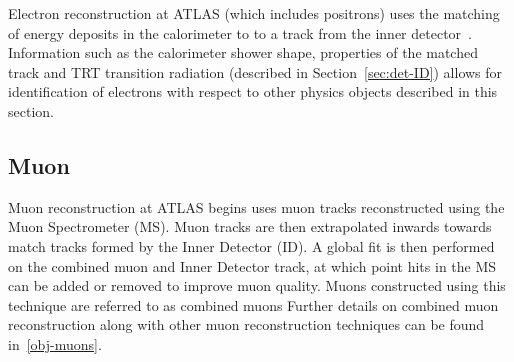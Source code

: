 Electron reconstruction at ATLAS (which includes positrons) uses
the matching of energy deposits in the calorimeter to
to a track from the inner detector~\cite{obj-electron}.
Information such as the calorimeter shower shape,
properties of the matched track
and TRT transition radiation (described in Section~\ref{sec:det-ID})
allows for identification of electrons with respect to other physics objects described in this section.

\subsection{Muon}
\label{sec:obj-muon}

Muon reconstruction at ATLAS begins uses muon tracks reconstructed using the Muon Spectrometer (MS).
Muon tracks are then extrapolated inwards towards match tracks formed by the Inner Detector (ID).
A global fit is then performed on the combined muon and Inner Detector track,
at which point hits in the MS can be added or removed to improve muon quality.
Muons constructed using this technique are referred to as combined muons
Further details on combined muon reconstruction along with
other muon reconstruction techniques can be found in~\ref{obj-muons}.


